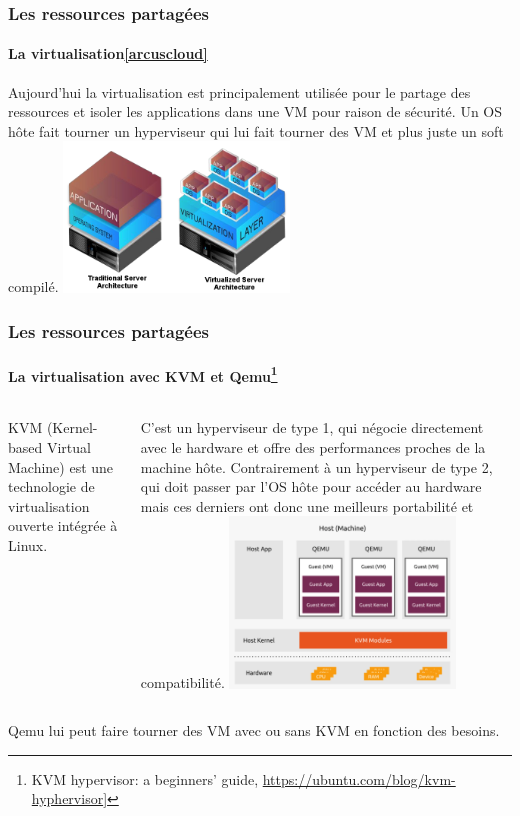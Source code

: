 \documentclass{beamer}
\begin{document}
    \begin{frame}
        \transdissolve
        \frametitle{Les ressources partagées}
        \framesubtitle{La virtualisation\cref{arcuscloud}}
        Aujourd'hui la virtualisation est principalement utilisée pour le partage des ressources et isoler les applications dans une VM pour raison de sécurité.
        Un OS hôte fait tourner un hyperviseur qui lui fait tourner des VM et plus juste un soft compilé.
        \bigbreak
        \centering
        \includegraphics[width=6cm]{image/virtualisation.png}
    \end{frame}

    \begin{frame}
        \transdissolve
        \frametitle{Les ressources partagées}
        \framesubtitle{La virtualisation avec KVM et Qemu\footnote{\label{ubuntukvm}KVM hypervisor: a beginners’ guide, \url{https://ubuntu.com/blog/kvm-hyphervisor}]}}
        \begin{columns}
            KVM (Kernel-based Virtual Machine) est une technologie de virtualisation ouverte intégrée à Linux.

            C'est un hyperviseur de type 1, qui négocie directement avec le hardware et offre des performances proches de la machine hôte.
            Contrairement à un hyperviseur de type 2, qui doit passer par l'OS hôte pour accéder au hardware mais ces derniers ont donc une meilleurs portabilité et compatibilité.
            \centering
            \includegraphics[width=6cm]{image/kvm-qemu.png}
        \end{columns}
        \bigbreak
        Qemu lui peut faire tourner des VM avec ou sans KVM en fonction des besoins.
    \end{frame}
\end{document}

